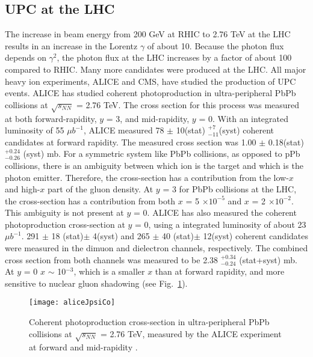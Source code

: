   \subsection{ UPC \JPsi{} at the LHC}
    The increase in beam energy from 200 GeV at RHIC to 2.76 TeV at the LHC 
      results in an increase in the Lorentz $\gamma$ of about 10.
    Because the photon flux depends on $\gamma^{2}$, the photon flux
      at the LHC increases by a factor of about 100 compared to RHIC.
    Many more \JPsi{} candidates were produced at the LHC. 
    All major heavy ion experiments, ALICE and CMS, have studied the production
      of UPC events. 
    ALICE has studied coherent \JPsi{} photoproduction in ultra-peripheral PbPb
      collisions at $\sqrt{s_{NN}}$ = 2.76 TeV. 
   The cross section for this process was measured at both forward-rapidity, 
      $y$ = 3, and mid-rapidity, $y$ = 0.
   With an integrated luminosity of 55 $\mu$$b^{-1}$, ALICE measured 
     78 $\pm$ 10(stat) $^{+7}_{-11}$(syst) coherent \JPsi{} candidates at 
     forward rapidity.
   The measured cross section was 1.00 $\pm$ 0.18(stat) $_{-0.26}^{+0.24}$ 
    (syst) mb.
   For a symmetric system like PbPb collisions, as opposed to pPb collisions, 
    there is an ambiguity between which ion is the target and which is the 
    photon emitter. 
  Therefore, the cross-section has a contribution from the low-$x$ and high-$x$ 
    part of the gluon density. 
  At $y$ = 3  for PbPb collisions at the LHC, the cross-section has a 
    contribution from both $x$ = 5 $\times 10^{-5}$ and $x$ = 2  $\times 
    10^{-2}$.
  This ambiguity is not present at $y$ = 0.
  ALICE has also measured the coherent \JPsi{} photoproduction cross-section 
    at $y$ = 0, using a integrated luminosity of about 23 $\mu$$b^{-1}$.
  291 $\pm$ 18 (stat)$\pm$ 4(syst) and 265 $\pm$ 40 (stat)$\pm$ 12(syst) 
    coherent \JPsi{} candidates were measured in the dimuon and dielectron
    channels, respectively. 
  The combined cross section from both channels was measured to be 
    2.38 $_{-0.24}^{+0.34}$ (stat+syst) mb. 
  At $y$ = 0 $x$ $\sim$ 10$^{-3}$, which is a smaller $x$ than at forward 
    rapidity, and more sensitive to nuclear gluon shadowing 
    (see Fig.~\ref{fig:aliceMoney}).
    \begin{figure}[!Hhbt]
      \centering
      \texttt{[image: aliceJpsiCo]}
      \caption{Coherent \JPsi photoproduction cross-section in ultra-peripheral
        PbPb collisions at $\sqrt{s_{NN}}$ = 2.76 TeV, measured by the ALICE 
        experiment at forward and mid-rapidity \cite{}.}
      \label{fig:aliceMoney}
    \end{figure}

